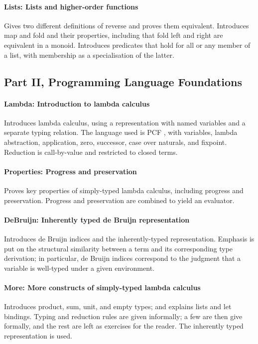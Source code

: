 \documentclass[preprint,authoryear]{elsarticle}
\begin{document}
\paragraph{Lists: Lists and higher-order functions}
Gives two different definitions of reverse and proves them equivalent.
Introduces map and fold and their properties, including that fold left
and right are equivalent in a monoid.  Introduces predicates that hold
for all or any member of a list, with membership as a specialisation
of the latter.

\subsection*{Part II, Programming Language Foundations}

\paragraph{Lambda: Introduction to lambda calculus}
Introduces lambda calculus, using a representation with named
variables and a separate typing relation. The language used is PCF
\citep{Plotkin-1977}, with variables, lambda abstraction, application,
zero, successor, case over naturals, and fixpoint. Reduction is
call-by-value and restricted to closed terms.

\paragraph{Properties: Progress and preservation}
Proves key properties of simply-typed
lambda calculus, including progress and preservation.  Progress and
preservation are combined to yield an evaluator.

\paragraph{DeBruijn: Inherently typed de Bruijn representation}
Introduces de Bruijn indices and the inherently-typed representation.
Emphasis is put on the structural similarity between a term and its
corresponding type derivation; in particular, de Bruijn indices
correspond to the judgment that a variable is well-typed under a given
environment.

\paragraph{More: More constructs of simply-typed lambda calculus}
Introduces product, sum, unit, and empty types; and explains lists and let bindings.
Typing and reduction rules are given informally; a few
are then give formally, and the rest are left as exercises for the reader.
The inherently typed representation is used.
\end{document}
